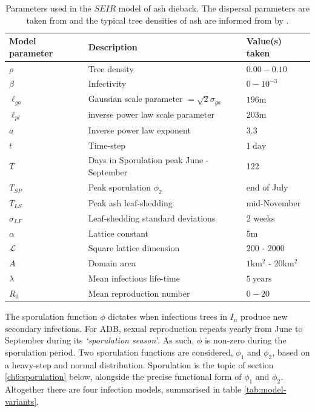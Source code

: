 \begin{table}[h]
\centering
\begin{tabular}{l l l}
\hline
\textbf{Model parameter} & \textbf{Description} & \textbf{Value(s) taken}\\
\hline
$\rho$  & Tree density & $0.00 - 0.10$ \\ 
$\beta$ & Infectivity & $0 - 10^{-3}$ \\
$\ell_{ga}$ & Gaussian scale parameter $=\sqrt{2}\sigma_{ga}$ & $196\mathrm{m}$ \\
$\ell_{pl}$ & inverse power law scale parameter & $203\mathrm{m}$ \\
$a$ & Inverse power law exponent & $3.3$ \\
$t$ & Time-step & $1\ \mathrm{day}$\\
$T$ & Days in Sporulation peak June - September & 122  \\
$T_{SP}$ & Peak sporulation $\phi_2$ & end of July \\
$T_{LS}$ & Peak ash leaf-shedding & mid-November \\
$\sigma_{LF}$ & Leaf-shedding standard deviations & 2 weeks \\
$\alpha$ & Lattice constant & $5\mathrm{m}$ \\
$\mathcal{L}$ & Square lattice dimension & $200$ - $2000$ \\
$A$ & Domain area & $1\mathrm{km^2}$ - $20\mathrm{km^2}$ \\
$\lambda$ & Mean infectious life-time & $5\ \mathrm{years}$ \\
$R_0$ & Mean reproduction number & $0-20$ \\
\hline
\end{tabular}
\caption{Parameters used in the $SEIR$ model of ash dieback. The dispersal parameters are taken from \cite{grosdidier2018tracking} and the typical tree densities of ash are informed from by \cite{hill.data}.}
\label{tab:SEIR-model}
\end{table}

The sporulation function $\phi$ dictates when infectious trees in $I_n$ produce new secondary infections. 
For ADB, sexual reproduction repeats yearly from June to September during its \textit{`sporulation season'}.
As such, $\phi$ is non-zero during the sporulation period.
Two sporulation functions are considered, $\phi_1$ and $\phi_2$, based on a heavy-step and normal distribution.
Sporulation is the topic of section \ref{ch6:sporulation} below, alongside the precise functional form of $\phi_1$ and $\phi_2$.
Altogether there are four infection models, summarised in table \ref{tab:model-variants}.

